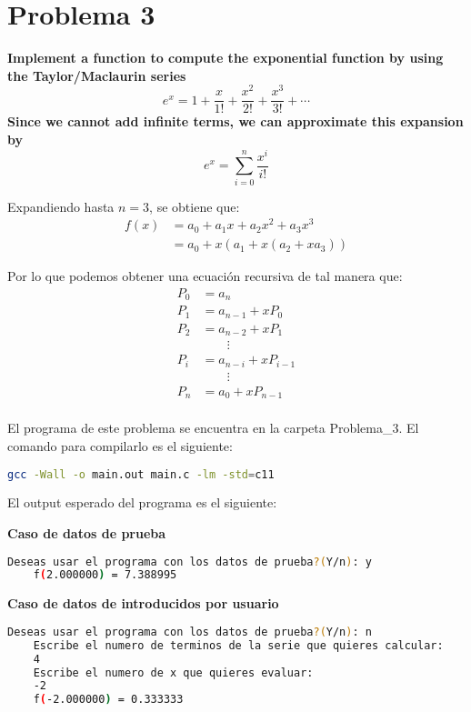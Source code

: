 \section*{Problema 3}
\textbf{Implement a function to compute the exponential function by using the
    Taylor/Maclaurin series
    \begin{equation*}
        e^x= 1+ \frac{x}{1!}+\frac{x^2}{2!}+\frac{x^3}{3!}+ \cdots
    \end{equation*}
    Since we cannot add infinite terms, we can approximate this expansion by
    \begin{equation*}
        e^x= \sum_{i=0}^n \frac{x^i}{i!}
    \end{equation*}
}

Expandiendo hasta $n=3$, se obtiene que:
\begin{align*}
    f(x) & = a_0+a_1x+a_2x^2+a_3x^3 \\
         & = a_0+x(a_1+x(a_2+xa_3))
\end{align*}

Por lo que podemos obtener una ecuación recursiva de tal manera que:
\begin{align*}
    P_0 & = a_n                \\
    P_1 & = a_{n-1}+xP_0       \\
    P_2 & = a_{n-2}+xP_{1}     \\
        & \qquad \vdots        \\
    P_i & = a_{n-i} + xP_{i-1} \\
        & \qquad \vdots        \\
    P_n & = a_{0} +xP_{n-1}    \\
\end{align*}

El programa de este problema se encuentra en la carpeta \textcolor{citecolor}{Problema\_3}. El comando para compilarlo es el siguiente:

\begin{lstlisting}[language=bash]
    gcc -Wall -o main.out main.c -lm -std=c11
\end{lstlisting}

El output esperado del programa es el siguiente:

\textbf{Caso de datos de prueba}
\begin{lstlisting}[language=bash]
    Deseas usar el programa con los datos de prueba?(Y/n): y
    f(2.000000) = 7.388995
\end{lstlisting}

\textbf{Caso de datos de introducidos por usuario}
\begin{lstlisting}[language=bash]
    Deseas usar el programa con los datos de prueba?(Y/n): n
    Escribe el numero de terminos de la serie que quieres calcular:
    4
    Escribe el numero de x que quieres evaluar:
    -2
    f(-2.000000) = 0.333333    
\end{lstlisting}